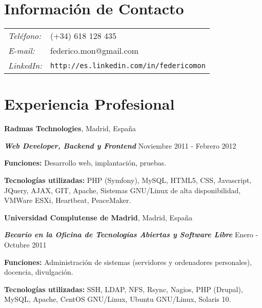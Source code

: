 \documentclass[margin,line]{resume}
\begin{document}
\address{Ingeniero en Informática}

\begin{resume}
\section{\sc Información de Contacto}
\vspace{.05in}
\begin{tabular}{@{}p{0.5in}p{2in}}
{\it Teléfono:} &(+34) 618 128 435 \\
{\it E-mail:} &{ federico.mon@gmail.com}\\
{\it LinkedIn:} &{ \tt http://es.linkedin.com/in/federicomon}\\
\end{tabular}

\section{\sc Experiencia Profesional}
{\bf Radmas Technologies}, Madrid, España

\vspace{-.3cm}
{\bf \em Web Developer, Backend y Frontend} \hfill
{ Noviembre 2011 - Febrero 2012
}

\begin{list2}
\vspace*{.05in}
\item {\bf Funciones: }{Desarrollo web, implantación, pruebas.}
\item {\bf Tecnologías utilizadas: }{PHP (Symfony), MySQL, HTML5, CSS,
Javascript, JQuery, AJAX, GIT, Apache, Sistemas GNU/Linux de alta
disponibilidad, VMWare ESXi, Heartbeat, PeaceMaker.}
\end{list2}

{\bf Universidad Complutense de Madrid}, Madrid, España

\vspace{-.3cm}
{\bf \em Becario en la Oficina de Tecnologías Abiertas y Software Libre} \hfill
{ Enero - Octubre 2011
}
\begin{list2}
\vspace*{.05in}
\item {\bf Funciones: }{Administración de sistemas (servidores y ordenadores
personales), docencia, divulgación.}
\item {\bf Tecnologías utilizadas: }{SSH, LDAP, NFS, Rsync, Nagios, PHP
(Drupal), MySQL, Apache, CentOS GNU/Linux, Ubuntu GNU/Linux, Solaris 10.}
\end{list2}



\end{resume}
\end{document}
